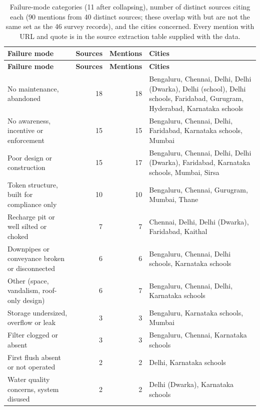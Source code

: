 {\scriptsize\setlength{\tabcolsep}{3pt}
\begin{longtable}{p{5cm} r r p{7.5cm}}
\caption{Failure-mode categories (11 after collapsing), number of distinct sources citing each (90 mentions from 40 distinct sources; these overlap with but are not the same set as the 46 survey records), and the cities concerned. Every mention with URL and quote is in the source extraction table supplied with the data.}\label{tab:fm}\\
\toprule
\textbf{Failure mode} & \textbf{Sources} & \textbf{Mentions} & \textbf{Cities}\\ \midrule\endfirsthead
\toprule \textbf{Failure mode} & \textbf{Sources} & \textbf{Mentions} & \textbf{Cities}\\ \midrule\endhead
\bottomrule\endfoot
No maintenance, abandoned & 18 & 18 & Bengaluru, Chennai, Delhi, Delhi (Dwarka), Delhi (school), Delhi schools, Faridabad, Gurugram, Hyderabad, Karnataka schools\\
No awareness, incentive or enforcement & 15 & 15 & Bengaluru, Chennai, Delhi, Faridabad, Karnataka schools, Mumbai\\
Poor design or construction & 15 & 17 & Bengaluru, Chennai, Delhi, Delhi (Dwarka), Faridabad, Karnataka schools, Mumbai, Sirsa\\
Token structure, built for compliance only & 10 & 10 & Bengaluru, Chennai, Gurugram, Mumbai, Thane\\
Recharge pit or well silted or choked & 7 & 7 & Chennai, Delhi, Delhi (Dwarka), Faridabad, Kaithal\\
Downpipes or conveyance broken or disconnected & 6 & 6 & Bengaluru, Chennai, Delhi schools, Karnataka schools\\
Other (space, vandalism, roof-only design) & 6 & 7 & Bengaluru, Chennai, Delhi, Karnataka schools\\
Storage undersized, overflow or leak & 3 & 3 & Bengaluru, Karnataka schools, Mumbai\\
Filter clogged or absent & 3 & 3 & Bengaluru, Chennai, Karnataka schools\\
First flush absent or not operated & 2 & 2 & Delhi, Karnataka schools\\
Water quality concerns, system disused & 2 & 2 & Delhi (Dwarka), Karnataka schools\\
\end{longtable}}
